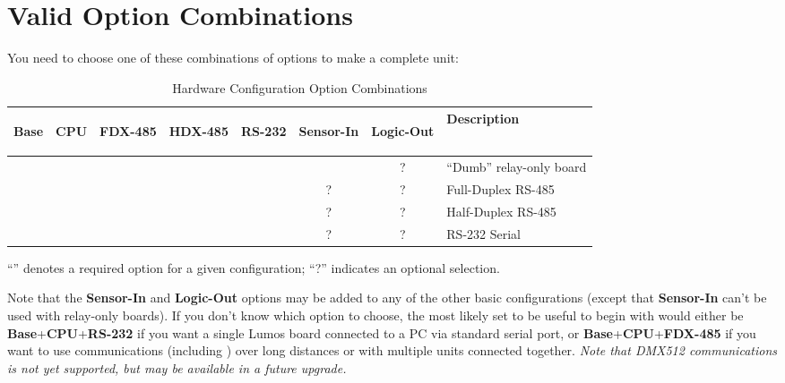 \documentclass[letterpaper,twoside,onecolumn,openright,final]{memoir}
\begin{document}
\section{Valid Option Combinations}
You need to choose one of these combinations of options to make a complete unit:
\begin{table}[h]
\begin{center}
    \begin{tabular}{cccccccl}\toprule
	
\begin{sideways}\bfseries Base \end{sideways}
& \begin{sideways}\bfseries CPU \end{sideways}
& \begin{sideways}\bfseries FDX-485\end{sideways}
& \begin{sideways}\bfseries HDX-485\end{sideways}
& \begin{sideways}\bfseries RS-232 \end{sideways}
& \begin{sideways}\bfseries Sensor-In \end{sideways}
& \begin{sideways}\bfseries Logic-Out\quad\strut \end{sideways}
& \bfseries Description
\\\midrule
	\Checkmark&          &          &          &          &          & ?        & ``Dumb'' relay-only board\\\hline
	\Checkmark&\Checkmark&\Checkmark&          &          & ?        & ?        & Full-Duplex RS-485\\\hline
	\Checkmark&\Checkmark&          &\Checkmark&          & ?        & ?        & Half-Duplex RS-485\\\hline
	\Checkmark&\Checkmark&          &          &\Checkmark& ?        & ?        & RS-232 Serial\\\bottomrule
    \end{tabular}
\end{center}
\caption{Hardware Configuration Option Combinations}
\end{table}

``\Checkmark'' denotes a required option for a given configuration; ``?'' indicates an optional selection.

Note that the {\bfseries Sensor-In} and {\bfseries Logic-Out} options may be added to any of the other basic
configurations (except that {\bfseries Sensor-In} can't be used with relay-only boards).  If you don't know which option to choose, the most likely
set to be useful to begin with would either be {\bfseries Base}+{\bfseries CPU}+{\bfseries RS-232} if
you want a single Lumos board connected to a PC via standard serial port, or
{\bfseries Base}+{\bfseries CPU}+{\bfseries FDX-485} if you want to use  communications (including
) over long distances or with multiple units connected together.
\emph{Note that DMX512 communications is not yet supported, but may be available in a future upgrade.}
\end{document}
